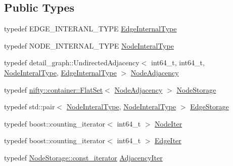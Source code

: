 \subsection*{Public Types}
\begin{DoxyCompactItemize}
\item 
typedef E\+D\+G\+E\+\_\+\+I\+N\+T\+E\+R\+A\+N\+L\+\_\+\+T\+Y\+PE \hyperlink{structnifty_1_1graph_1_1detail__graph_1_1UndirectedGraphTypeHelper_ac7309a31e7a003860ce1f1a882e6813e}{Edge\+Internal\+Type}
\item 
typedef N\+O\+D\+E\+\_\+\+I\+N\+T\+E\+R\+N\+A\+L\+\_\+\+T\+Y\+PE \hyperlink{structnifty_1_1graph_1_1detail__graph_1_1UndirectedGraphTypeHelper_a4c2041ab030e3eb561a2955a3bbfb5d7}{Node\+Interal\+Type}
\item 
typedef detail\+\_\+graph\+::\+Undirected\+Adjacency$<$ int64\+\_\+t, int64\+\_\+t, \hyperlink{structnifty_1_1graph_1_1detail__graph_1_1UndirectedGraphTypeHelper_a4c2041ab030e3eb561a2955a3bbfb5d7}{Node\+Interal\+Type}, \hyperlink{structnifty_1_1graph_1_1detail__graph_1_1UndirectedGraphTypeHelper_ac7309a31e7a003860ce1f1a882e6813e}{Edge\+Internal\+Type} $>$ \hyperlink{structnifty_1_1graph_1_1detail__graph_1_1UndirectedGraphTypeHelper_a626e3edd4cc8c7e33ec89e6a7454561a}{Node\+Adjacency}
\item 
typedef \hyperlink{classnifty_1_1container_1_1FlatSet}{nifty\+::container\+::\+Flat\+Set}$<$ \hyperlink{structnifty_1_1graph_1_1detail__graph_1_1UndirectedGraphTypeHelper_a626e3edd4cc8c7e33ec89e6a7454561a}{Node\+Adjacency} $>$ \hyperlink{structnifty_1_1graph_1_1detail__graph_1_1UndirectedGraphTypeHelper_a55013bcacc1d016637b29ab2c33ac52a}{Node\+Storage}
\item 
typedef std\+::pair$<$ \hyperlink{structnifty_1_1graph_1_1detail__graph_1_1UndirectedGraphTypeHelper_a4c2041ab030e3eb561a2955a3bbfb5d7}{Node\+Interal\+Type}, \hyperlink{structnifty_1_1graph_1_1detail__graph_1_1UndirectedGraphTypeHelper_a4c2041ab030e3eb561a2955a3bbfb5d7}{Node\+Interal\+Type} $>$ \hyperlink{structnifty_1_1graph_1_1detail__graph_1_1UndirectedGraphTypeHelper_a43eb7f2cfb5036f87e9496bb6b8d064d}{Edge\+Storage}
\item 
typedef boost\+::counting\+\_\+iterator$<$ int64\+\_\+t $>$ \hyperlink{structnifty_1_1graph_1_1detail__graph_1_1UndirectedGraphTypeHelper_a33768d5fbeda97627a0e4a67eb50776c}{Node\+Iter}
\item 
typedef boost\+::counting\+\_\+iterator$<$ int64\+\_\+t $>$ \hyperlink{structnifty_1_1graph_1_1detail__graph_1_1UndirectedGraphTypeHelper_adcb9afc6e254d52edcb21e1be522dce7}{Edge\+Iter}
\item 
typedef \hyperlink{classnifty_1_1container_1_1FlatSet_a0f4cd26da060859b18742abfd534aa24}{Node\+Storage\+::const\+\_\+iterator} \hyperlink{structnifty_1_1graph_1_1detail__graph_1_1UndirectedGraphTypeHelper_aae80a660c99b4e51c90a98f70496a8ea}{Adjacency\+Iter}
\end{DoxyCompactItemize}


